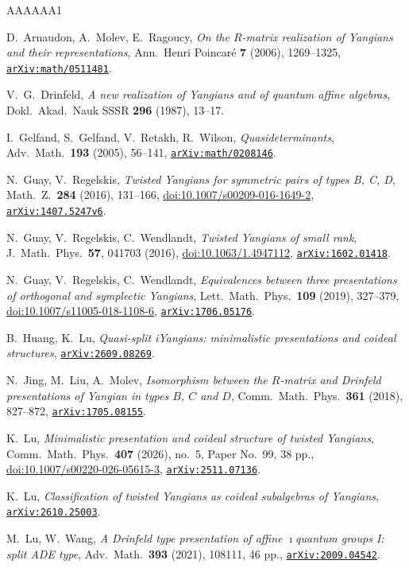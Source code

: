 \documentclass{amsart}
\numberwithin{equation}{section}
\theoremstyle{remark}
\newcommand{\nc}{\newcommand}
\renewcommand{\,}{\kern 0.1em} %
\begin{document}
\begin{thebibliography}{AAAAAA1}

\nc{\arxiv}[1]{\href{http://arxiv.org/abs/#1}{\tt arXiv:\nolinkurl{#1}}}
\nc\doi[1]{\href{https://dx.doi.org/#1}{doi:#1}}


	D.~Arnaudon, A.~Molev, E.~Ragoucy,
	{\it On the $R$-matrix realization of Yangians and their representations},
	Ann.~Henri Poincar\'e {\bf 7} (2006), 1269--1325,
	\arxiv{math/0511481}.

	V.~G.~Drinfeld,
	{\it A new realization of Yangians and of quantum affine algebras},
	Dokl.~Akad.~Nauk SSSR {\bf 296} (1987), 13--17.

	I.~Gelfand, S.~Gelfand, V.~Retakh, R.~Wilson, 
	{\it Quasideterminants},
	Adv.~Math.~{\bf 193} (2005), 56--141,
	\arxiv{math/0208146}.

	N.~Guay, V.~Regelskis,
	{\it Twisted Yangians for symmetric pairs of types B, C, D},
	Math.~Z.~{\bf 284} (2016), 131--166,
	\doi{10.1007/s00209-016-1649-2},
	\arxiv{1407.5247v6}.

	N.~Guay, V.~Regelskis, C.~Wendlandt,
	{\it Twisted Yangians of small rank},
	J.~Math.~Phys.~{\bf 57}, 041703 (2016),
	\doi{10.1063/1.4947112},
	\arxiv{1602.01418}.

	N.~Guay, V.~Regelskis, C.~Wendlandt,
	{\it Equivalences between three presentations of orthogonal and symplectic Yangians},
	Lett.~Math.~Phys.~{\bf 109} (2019), 327--379,
	\doi{10.1007/s11005-018-1108-6},
	\arxiv{1706.05176}.

	B.~Huang, K.~Lu,
	{\it Quasi-split iYangians: minimalistic presentations and coideal structures},
	\arxiv{2609.08269}.

	N.~Jing, M.~Liu, A.~Molev,
	{\it Isomorphism between the $R$-matrix and Drinfeld presentations of Yangian in types $B$, $C$ and $D$},
	Comm.~Math.~Phys.~{\bf 361} (2018), 827--872,
	\arxiv{1705.08155}.

	K.~Lu,
	{\it Minimalistic presentation and coideal structure of twisted Yangians},
	Comm.~Math.~Phys.~{\bf 407} (2026), no.~5, Paper No.~99, 38 pp.,
	\doi{10.1007/s00220-026-05615-3},
	\arxiv{2511.07136}.

	K.~Lu,
	{\it Classification of twisted Yangians as coideal subalgebras of Yangians},
	\arxiv{2610.25003}.

	M.~Lu, W.~Wang,
	{\it A Drinfeld type presentation of affine $\imath$quantum groups I: split ADE type},
	Adv.~Math.~{\bf 393} (2021), 108111, 46 pp.,
	\arxiv{2009.04542}.


\end{thebibliography}
\end{document}
